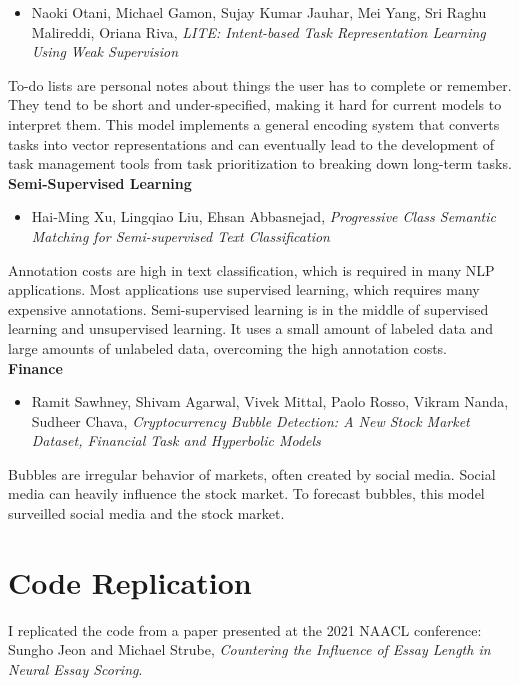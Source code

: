 \documentclass[11pt]{article}
\begin{document}
\begin{itemize}
\item Naoki Otani, Michael Gamon, Sujay Kumar Jauhar, Mei Yang, Sri Raghu Malireddi, Oriana Riva, \emph{LITE: Intent-based Task Representation Learning Using Weak Supervision}
\end{itemize}
To-do lists are personal notes about things the user has to complete or remember. They tend to be short and under-specified, making it hard for current models to interpret them. This model implements a general encoding system that converts tasks into vector representations and can eventually lead to the development of task management tools from task prioritization to breaking down long-term tasks.
\\[12pt]
\noindent
\textbf{Semi-Supervised Learning}
\begin{itemize}
\item Hai-Ming Xu, Lingqiao Liu, Ehsan Abbasnejad, \emph{Progressive Class Semantic Matching for Semi-supervised Text Classification}
\end{itemize}
Annotation costs are high in text classification, which is required in many NLP applications. Most applications use supervised learning, which requires many expensive annotations. Semi-supervised learning is in the middle of supervised learning and unsupervised learning. It uses a small amount of labeled data and large amounts of unlabeled data, overcoming the high annotation costs. 
\\[12pt]
\noindent
\textbf{Finance}
\begin{itemize}
\item Ramit Sawhney, Shivam Agarwal, Vivek Mittal, Paolo Rosso, Vikram Nanda, Sudheer Chava, \emph{Cryptocurrency Bubble Detection: A New Stock Market Dataset, Financial Task and Hyperbolic Models}
\end{itemize}
Bubbles are irregular behavior of markets, often created by social media. Social media can heavily influence the stock market. To forecast bubbles, this model surveilled social media and the stock market.




\section{Code Replication}
I replicated the code from a paper presented at the 2021 NAACL conference: Sungho Jeon and Michael Strube, \emph{Countering the Influence of Essay Length in Neural Essay Scoring}. 
\end{document}

